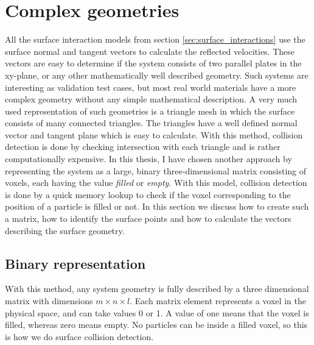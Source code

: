 \section{Complex geometries}
All the surface interaction models from section \ref{sec:surface_interactions} use the surface normal and tangent vectors to calculate the reflected velocities. These vectors are easy to determine if the system consists of two parallel plates in the xy-plane, or any other mathematically well described geometry. Such systems are interesting as validation test cases, but most real world materials have a more complex geometry without any simple mathematical description. A very much used representation of such geometries is a triangle mesh in which the surface consists of many connected triangles. The triangles have a well defined normal vector and tangent plane which is easy to calculate. With this method, collision detection is done by checking intersection with each triangle and is rather computationally expensive. In this thesis, I have chosen another approach by representing the system as a large, binary three-dimensional matrix consisting of voxels, each having the value \textit{filled} or \textit{empty}. With this model, collision detection is done by a quick memory lookup to check if the voxel corresponding to the position of a particle is filled or not. In this section we discuss how to create such a matrix, how to identify the surface points and how to calculate the vectors describing the surface geometry.

\subsection{Binary representation}
\label{sec:dsmc_binary_representation}
With this method, any system geometry is fully described by a three dimensional matrix with dimensions $m\times n\times l$. Each matrix element represents a voxel in the physical space, and can take values 0 or 1. A value of one means that the voxel is filled, whereas zero means empty. No particles can be inside a filled voxel, so this is how we do surface collision detection. 

